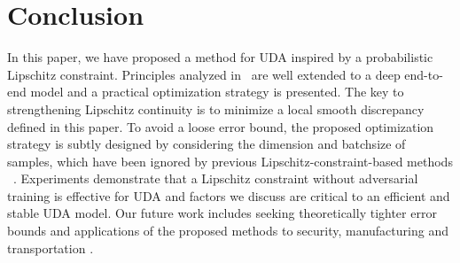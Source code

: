 \documentclass[journal,twocolumn]{IEEEtran}
\theoremstyle{definition}
\begin{document}
\section{Conclusion}
In this paper, we have proposed a method for UDA inspired by a probabilistic Lipschitz constraint. Principles analyzed in~\cite{Ben-David2014} are well extended to a deep end-to-end model and a practical optimization strategy is presented. The key to strengthening Lipschitz continuity is to minimize a local smooth discrepancy defined in this paper. To avoid a loose error bound, the proposed optimization strategy is subtly designed by considering the dimension and batchsize of samples, which have been ignored by previous Lipschitz-constraint-based methods
~\cite{shu2018a,miyato2018virtual,mao2019virtual}. 
Experiments demonstrate that a  Lipschitz constraint without adversarial training is effective for UDA and factors we discuss are critical to an efficient and stable UDA model. Our future work includes seeking  theoretically tighter error bounds and applications of the proposed methods to security, manufacturing and transportation 
\cite{9049451,9205684,8951126,8848867}.





















\ifCLASSOPTIONcaptionsoff
  \newpage
\fi



\end{document}
